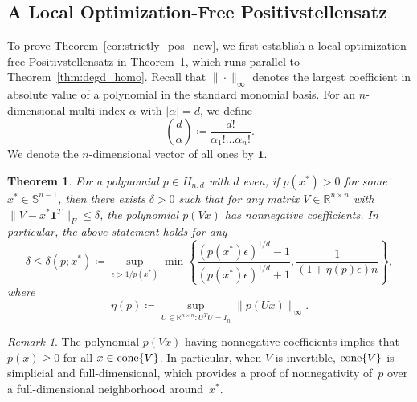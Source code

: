 \documentclass[12pt]{article}
\newcommand{\reals}{\mathbb{R}}
\newcommand{\defeq}{\coloneq}
\newcommand{\cone}{\operatornamewithlimits{cone}}
\newcommand{\mbS}{\mathbb{S}}
\newtheorem{theorem}{Theorem}%
\theoremstyle{remark}
\newtheorem{remark}{Remark}%
\begin{document}
\subsection{A Local Optimization-Free Positivstellensatz}
 To prove Theorem~\ref{cor:strictly_pos_new}, we first establish {a} local optimization-free Positivstellensatz in Theorem~\ref{thm:degd_homo_new}, which runs parallel to Theorem~\ref{thm:degd_homo}. Recall that $\|\cdot\|_{\infty}$ denotes the largest coefficient in absolute value of a polynomial in the standard monomial basis. For an $n$-dimensional multi-index $\alpha$ with $|\alpha|=d$, we define
 \[\binom{d}{\alpha}\defeq \frac{d!}{\alpha_1!\ldots\alpha_n!}.\]
We denote the $n$-dimensional vector of all ones by $\mathbf{1}$.




\begin{theorem}\label{thm:degd_homo_new}
For a polynomial $p\in H_{n,d}$ with $d$ even, if $p(x^*)>0$ for some $x^*\in \mbS^{n-1}$, then there exists $\delta >0$ such that for any matrix $V\in\reals^{n\times n}$ with $\|V-x^*\mathbf{1}^T\|_{F}\le \delta$, the polynomial $p(Vx)$ has nonnegative coefficients.
In particular, the above statement holds for any
\[\delta \le \delta(p;x^*)\defeq \sup_{\epsilon>1/p(x^*)}\min\left\{\frac{(p(x^*)\epsilon)^{1/d}-1}{( p(x^*)\epsilon)^{1/d}+1},\frac{1}{(1+\eta(p)\epsilon)n}\right\},\]
where
\[\eta(p)\defeq\sup_{U\in\reals^{n\times n}:U^TU=I_n} \|p(Ux)\|_{\infty}.\]
\end{theorem}

\begin{remark}
The polynomial $p(Vx)$ having nonnegative coefficients implies that $p(x)\ge 0$ for all $x\in\cone\{V\}$. In particular, when $V$ is invertible, $\cone\{V\}$ is simplicial and full-dimensional, which provides a proof of nonnegativity of~$p$ over a full-dimensional neighborhood around~$x^*$.
\end{remark}
\end{document}

